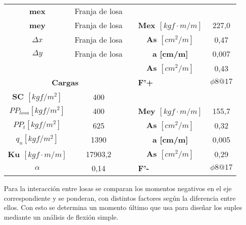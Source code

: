 \begin{table}[H]
{\begin{tabular}{cccp{8.215em}c}
            \cline{4-5}    \textbf{mex} & Franja de losa &       & \multicolumn{1}{c}{} &  \bigstrut[t]\\
            \textbf{mey} & Franja de losa &       & \multicolumn{1}{c}{\boldmath{}\textbf{Mex $[kgf \cdot m/m]$}\unboldmath{}} & 227,0 \\
            \boldmath{}\textbf{$\Delta x$}\unboldmath{} & Franja de losa &       & \multicolumn{1}{c}{\boldmath{}\textbf{As $[cm^2/m]$}\unboldmath{}} & 0,47 \\
            \boldmath{}\textbf{$\Delta y$}\unboldmath{} & Franja de losa &       & \multicolumn{1}{c}{\textbf{a [cm/m]}} & 0,007 \\
                  &       &       & \multicolumn{1}{c}{\boldmath{}\textbf{As $[cm^2/m]$}\unboldmath{}} & 0,43 \bigstrut[b]\\
            \cline{1-2}\cline{4-5}    \multicolumn{2}{c}{\textbf{Cargas}} &       & \textbf{F'+} & \boldmath{}\textbf{$\phi8@17$}\unboldmath{} \bigstrut\\
            \cline{1-2}\cline{4-5}    \boldmath{}\textbf{SC $[kgf/m^2]$}\unboldmath{} & 400   &       & \multicolumn{1}{c}{} &  \bigstrut[t]\\
            \boldmath{}\textbf{$PP_{losa} [kgf/m^2]$}\unboldmath{} & 400   &       & \multicolumn{1}{c}{\boldmath{}\textbf{Mey $[kgf \cdot m/m]$}\unboldmath{}} & 155,7 \\
            \boldmath{}\textbf{$PP_t [kgf/m^2]$}\unboldmath{} & 625   &       & \multicolumn{1}{c}{\boldmath{}\textbf{As $[cm^2/m]$}\unboldmath{}} & 0,32 \\
            \boldmath{}\textbf{$q_u [kgf/m^2]$}\unboldmath{} & 1390  &       & \multicolumn{1}{c}{\textbf{a [cm/m]}} & 0,005 \\
            \boldmath{}\textbf{Ku $[kgf \cdot m/m]$}\unboldmath{} & 17903,2 &       & \multicolumn{1}{c}{\boldmath{}\textbf{As $[cm^2/m]$}\unboldmath{}} & 0,29 \bigstrut[b]\\
            \cline{4-5}    \boldmath{}\textbf{$\alpha$}\unboldmath{} & 0,14  &       & \textbf{F'-} & \boldmath{}\textbf{$\phi8@17$}\unboldmath{} \bigstrut\\
            \hline
        \end{tabular}%
        }
      \label{analisis114}%
    \end{table}%
    
    Para la interacción entre losas se comparan los momentos negativos en el eje correspondiente y se ponderan, con distintos factores según la diferencia entre ellos. Con esto se determina un momento último que usa para diseñar los suples mediante un análisis de flexión simple.
    
